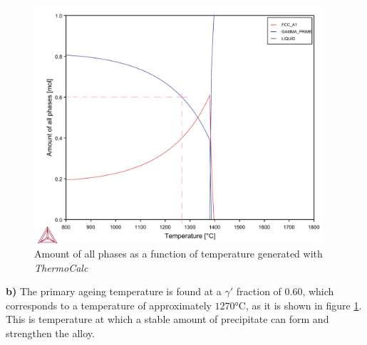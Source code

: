 \begin{figure}[h]
  \centering
    \includegraphics[width=0.95\textwidth]{graficas/Q4_02_1.png}
    \caption{Amount of all phases as a function of temperature generated with \textit{ThermoCalc} \citep{thermocalc}}
    \label{fig:diagram05}
\end{figure}

\textbf{b)} The primary ageing temperature is found at a $\gamma'$ fraction of 0.60, which corresponds to a temperature of approximately $1270$°C, as it is shown in figure \ref{fig:diagram05}. This is temperature at which a stable amount of precipitate can form and strengthen the alloy.